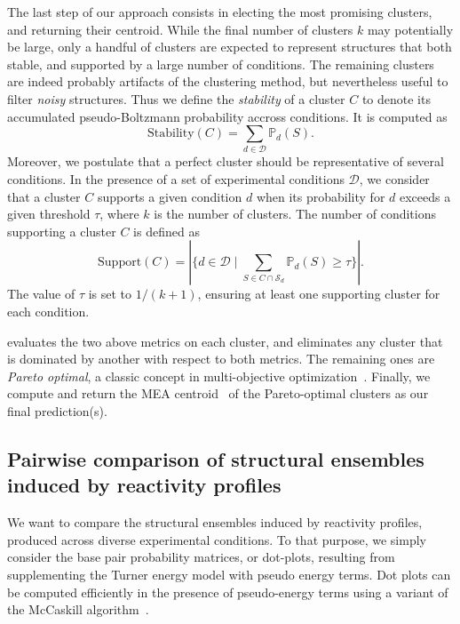 \documentclass[a4,center,fleqn]{NAR}
\newcommand{\Software}[1]{\text{\ttfamily\bfseries #1}}
\newcommand{\OurTool}{\Software{IPANEMAP}\xspace}
\newcommand{\NumClust}{k}
\newcommand{\Def}[1]{{\em #1}}
\begin{document}
The last step of our approach consists in electing the most promising clusters, and returning their centroid. While the final number of clusters $\NumClust$ may potentially be large, only a handful of clusters are expected to represent structures that both stable, and supported by a large number of conditions. The remaining clusters are indeed probably artifacts of the clustering method, but nevertheless useful to filter \emph{noisy} structures. Thus we define the \Def{stability} of a cluster $C$ to denote its accumulated pseudo-Boltzmann probability accross conditions. It is computed as 
\[\text{Stability}(C) = \sum_{d\in \mathcal{D}} \mathbb{P}_d(S).\]
Moreover, we postulate that a perfect cluster should be representative of several conditions. In the presence of a set of experimental conditions $\mathcal{D}$, we consider that a cluster $C$ supports a given condition $d$ when its probability for $d$ exceeds a given threshold $\tau$, where $\NumClust$ is the number of clusters. The number of conditions supporting a cluster $C$ is defined as
\[\text{Support}(C) = |\{d\in \mathcal{D} \mid \sum_{S\in C\cap \mathcal{S}_d} \mathbb{P}_d(S)\ge \tau \}|.\]
The value of $\tau$ is set to $1/(\NumClust+1)$, ensuring at least one supporting cluster for each condition.

\OurTool evaluates the two above metrics on each cluster, and eliminates any cluster that is dominated by another with respect to both metrics. The remaining ones are \Def{Pareto optimal}, a classic concept in multi-objective optimization~\cite{Mattson2005}. Finally, we compute and return the MEA centroid~\citep{Lu2009} of the Pareto-optimal clusters as our final prediction(s).



\subsection*{Pairwise comparison of structural ensembles induced by reactivity profiles}\label{sec:dotplots}

We want to compare the structural ensembles induced by reactivity profiles, produced across diverse experimental conditions. To that purpose, we simply consider the base pair probability matrices, or dot-plots, resulting from supplementing the Turner energy model with pseudo energy terms. %
Dot plots can be computed efficiently in the presence of pseudo-energy terms using a variant of the McCaskill algorithm~\citep{McCaskill1990}.
\end{document}

